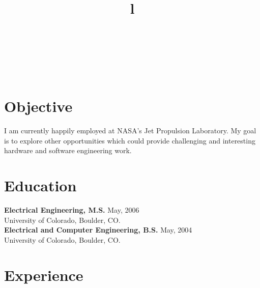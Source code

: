 \begin{resume}

\begin{format}
\title{l}\\
\\
\body\\
\end{format}

\section{\sc Objective}
I am currently happily employed at NASA's Jet Propulsion Laboratory. My goal is to explore other opportunities which could provide challenging and interesting hardware and software engineering work.
\section{\sc Education}
{\bf Electrical Engineering, M.S.} May, 2006\\
University of Colorado, Boulder, CO.\\

{\bf Electrical and Computer Engineering, B.S.} May, 2004\\
University of Colorado, Boulder, CO.\\
\section{\sc Experience}


\end{resume}
